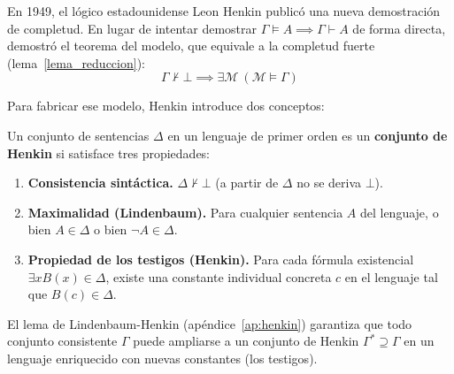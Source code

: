 En 1949, el lógico estadounidense Leon Henkin publicó una
nueva demostración de completud. En lugar de intentar demostrar $\Gamma \models A \implies \Gamma \vdash A$ de forma directa, demostró el teorema del modelo, que equivale a la completud fuerte (lema~\ref{lema_reduccion}):
\[
\Gamma \nvdash \bot \implies \exists \mathcal{M} \ (\mathcal{M} \models \Gamma)
\]

Para fabricar ese modelo, Henkin introduce dos conceptos:

\begin{definition}
Un conjunto de sentencias $\Delta$ en un lenguaje de primer orden es un \textbf{conjunto de Henkin} si satisface tres propiedades:
\begin{enumerate}
    \item \textbf{Consistencia sintáctica.} $\Delta \nvdash \bot$ (a partir de $\Delta$ no se deriva $\bot$).
    \item \textbf{Maximalidad (Lindenbaum).} Para cualquier sentencia $A$ del lenguaje, o bien $A \in \Delta$ o bien $\neg A \in \Delta$. 
    \item \textbf{Propiedad de los testigos (Henkin).} Para cada fórmula existencial $\exists x B(x) \in \Delta$, existe una constante individual concreta $c$ en el lenguaje tal que $B(c) \in \Delta$.
\end{enumerate}
\end{definition}

El lema de Lindenbaum-Henkin (apéndice~\ref{ap:henkin}) garantiza que todo conjunto consistente $\Gamma$ puede ampliarse a un conjunto de Henkin $\Gamma^* \supseteq \Gamma$ en un lenguaje enriquecido con nuevas constantes (los testigos).

